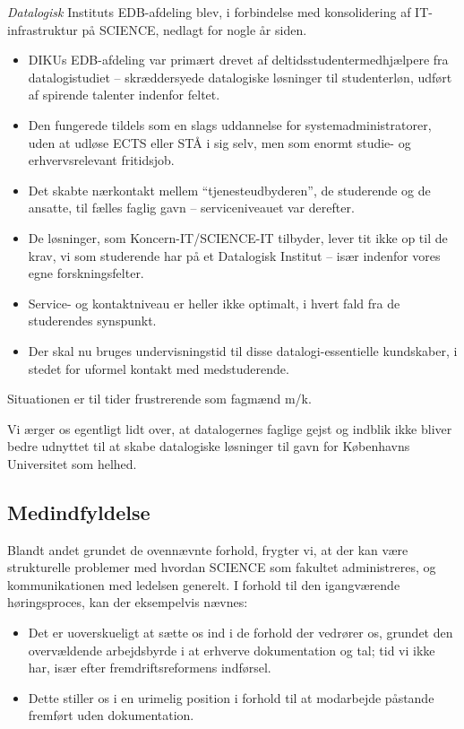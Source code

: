 \documentclass{article}
\begin{document}
\textit{Datalogisk} Instituts EDB-afdeling blev, i forbindelse med konsolidering af IT-infrastruktur på SCIENCE, nedlagt for
nogle år siden.
\begin{itemize}
\itemsep0em 
\item DIKUs EDB-afdeling var primært drevet af deltidsstudentermedhjælpere fra datalogistudiet --
skræddersyede datalogiske løsninger til studenterløn, udført af spirende talenter 
indenfor feltet.
\item Den fungerede tildels som en slags uddannelse for systemadministratorer, uden
at udløse ECTS eller STÅ i sig selv, men som enormt studie- og erhvervsrelevant
fritidsjob.
\item Det skabte nærkontakt mellem ``tjenesteudbyderen'', de studerende og de
ansatte, til fælles faglig gavn -- serviceniveauet var derefter.
\item De løsninger, som Koncern-IT/SCIENCE-IT tilbyder, lever tit ikke op til
de krav, vi som studerende har på et Datalogisk Institut -- især indenfor
vores egne forskningsfelter.
\item Service- og kontaktniveau er heller ikke optimalt, i hvert fald fra de
studerendes synspunkt.
\item Der skal nu bruges undervisningstid til disse datalogi-essentielle
kundskaber, i stedet for uformel kontakt med medstuderende.
\end{itemize}
Situationen er til tider frustrerende som fagmænd m/k.

Vi ærger os egentligt lidt over, at datalogernes faglige gejst og indblik
ikke bliver bedre udnyttet til at skabe datalogiske løsninger til gavn for
Københavns Universitet som helhed.

\subsection{Medindfyldelse}

Blandt andet grundet de ovennævnte forhold, frygter vi, at der kan være strukturelle
problemer med hvordan SCIENCE som fakultet administreres, og kommunikationen
med ledelsen generelt. I forhold til den igangværende høringsproces, kan der eksempelvis nævnes:

\begin{itemize}
\itemsep0em 
\item Det er uoverskueligt at sætte os ind i de forhold der vedrører os, grundet den
overvældende arbejdsbyrde i at erhverve dokumentation og tal; tid vi ikke har,
især efter fremdriftsreformens indførsel.
\item Dette stiller os i en urimelig position i forhold til at modarbejde påstande
fremført uden dokumentation.
\end{itemize}
\end{document}
